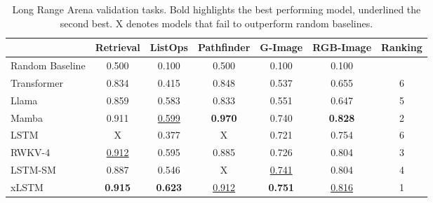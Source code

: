 \begin{table}
    \centering
    \begin{adjustbox}{width=1.0\textwidth}
    \begin{tabular}{lcccccc}
    \toprule
    & \textbf{Retrieval} & \textbf{ListOps} & \textbf{Pathfinder} & \textbf{G-Image} & \textbf{RGB-Image} & \textbf{Ranking} \\ \midrule
Random Baseline & 0.500 & 0.100 & 0.500 & 0.100 & 0.100 &  \\ \midrule
Transformer & 0.834 & 0.415 & 0.848 & 0.537 & 0.655 & 6 \\ 
Llama & 0.859 & 0.583 & 0.833 & 0.551 & 0.647 & 5\\ \midrule
Mamba & 0.911 & \underline{0.599} & \textbf{0.970} & 0.740 & \textbf{0.828} & 2 \\ \midrule
LSTM & X & 0.377 & X & 0.721 & 0.754 & 6 \\ 
RWKV-4 & \underline{0.912} & 0.595 & 0.885 & 0.726 & 0.804 & 3\\ 
LSTM-SM & 0.887 & 0.546 & X & \underline{0.741} & 0.804 & 4 \\ \midrule
xLSTM & \textbf{0.915} & \textbf{0.623} & \underline{0.912} & \textbf{0.751} & \underline{0.816} & 1 \\ 
\bottomrule
    \end{tabular}
    \end{adjustbox}
    \caption{Long Range Arena validation tasks. Bold highlights the best performing model, underlined the second best. X denotes models that fail to outperform random baselines.
    }
    \label{tab:lra_val_accuracy}
    
\end{table}